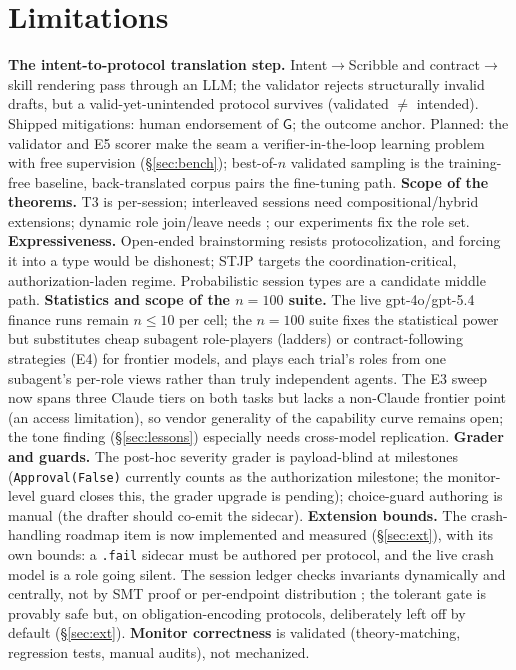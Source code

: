 \documentclass{article}
\newcommand{\gtG}{\mathsf{G}}
\newcommand{\stjp}{\textsc{STJP}}
\begin{document}
\section{Limitations}\label{sec:limits}
\textbf{The intent-to-protocol translation step.} Intent$\to$Scribble and contract$\to$skill rendering pass through an LLM; the validator rejects structurally invalid drafts, but a valid-yet-unintended protocol survives (validated $\neq$ intended). Shipped mitigations: human endorsement of $\gtG$; the outcome anchor. Planned: the validator and E5 scorer make the seam a verifier-in-the-loop learning problem with free supervision (\S\ref{sec:bench}); best-of-$n$ validated sampling is the training-free baseline, back-translated corpus pairs the fine-tuning path. \textbf{Scope of the theorems.} T3 is per-session; interleaved sessions need compositional/hybrid extensions; dynamic role join/leave needs \citep{denielou11}; our experiments fix the role set. \textbf{Expressiveness.} Open-ended brainstorming resists protocolization, and forcing it into a type would be dishonest; \stjp{} targets the coordination-critical, authorization-laden regime. Probabilistic session types are a candidate middle path. \textbf{Statistics and scope of the $n{=}100$ suite.} The live gpt-4o/gpt-5.4 finance runs remain $n\leq10$ per cell; the $n{=}100$ suite fixes the statistical power but substitutes cheap subagent role-players (ladders) or contract-following strategies (E4) for frontier models, and plays each trial's roles from one subagent's per-role views rather than truly independent agents. The E3 sweep now spans three Claude tiers on both tasks but lacks a non-Claude frontier point (an access limitation), so vendor generality of the capability curve remains open; the tone finding (\S\ref{sec:lessons}) especially needs cross-model replication. \textbf{Grader and guards.} The post-hoc severity grader is payload-blind at milestones (\texttt{Approval(False)} currently counts as the authorization milestone; the monitor-level guard closes this, the grader upgrade is pending); choice-guard authoring is manual (the drafter should co-emit the sidecar). \textbf{Extension bounds.} The crash-handling roadmap item is now implemented and measured (\S\ref{sec:ext}), with its own bounds: a \texttt{.fail} sidecar must be authored per protocol, and the live crash model is a role going silent. The session ledger checks invariants dynamically and centrally, not by SMT proof or per-endpoint distribution \citep{chen12}; the tolerant gate is provably safe but, on obligation-encoding protocols, deliberately left off by default (\S\ref{sec:ext}). \textbf{Monitor correctness} is validated (theory-matching, regression tests, manual audits), not mechanized.
\end{document}
